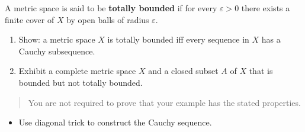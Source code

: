 \begin{problem}[?]

A metric space is said to be \textbf{totally bounded} if for every
\(\varepsilon> 0\) there exists a finite cover of \(X\) by open balls of
radius \(\varepsilon\).

\begin{enumerate}
\def\labelenumi{\alph{enumi}.}
\item
  Show: a metric space \(X\) is totally bounded iff every sequence in
  \(X\) has a Cauchy subsequence.
\item
  Exhibit a complete metric space \(X\) and a closed subset \(A\) of
  \(X\) that is bounded but not totally bounded.
\end{enumerate}

\begin{quote}
You are not required to prove that your example has the stated
properties.
\end{quote}

\end{problem}

\begin{concept}

\envlist

\begin{itemize}
\tightlist
\item
  Use diagonal trick to construct the Cauchy sequence.
\end{itemize}

\end{concept}

